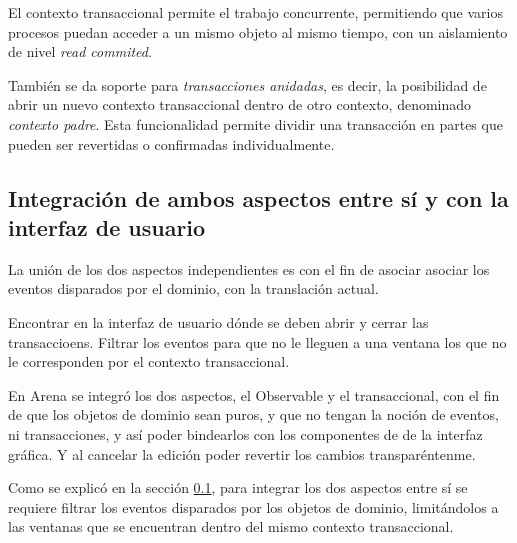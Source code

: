 		El contexto transaccional permite el trabajo concurrente, permitiendo que
		varios procesos puedan acceder a un mismo objeto al mismo
		tiempo, con un aislamiento de nivel \emph{read commited}.
		 
		También se da soporte para \emph{transacciones anidadas}, es decir, la
		posibilidad de abrir un nuevo contexto transaccional dentro de otro contexto,
		denominado \emph{contexto padre}.
		Esta funcionalidad permite dividir una transacción en partes que pueden ser
		revertidas o confirmadas individualmente.
		
	\subsection{Integración de ambos aspectos entre sí y con la interfaz de usuario}
	\label{sec:Union}
		La unión de los dos aspectos independientes es con el fin de asociar asociar los
		eventos disparados por el dominio, con la translación actual.
		 
		Encontrar en la interfaz de usuario dónde se deben abrir y cerrar las
		transaccioens.
		Filtrar los eventos para que no le lleguen a una ventana los que no le
		corresponden por el contexto transaccional.
	
		 En Arena se integró los dos aspectos, el Observable y
		el transaccional, con el fin de que los objetos de dominio sean puros, y que no tengan la noción de
		eventos, ni transacciones, y así poder bindearlos con los componentes de de la
		interfaz gráfica. Y al cancelar la edición poder revertir los cambios
		transparéntenme.
	
		Como se explicó en la sección \ref{sec:Union}, para integrar los dos aspectos
		entre sí se requiere filtrar los eventos disparados por los objetos de dominio, 
		limitándolos a las ventanas que se encuentran dentro del mismo contexto
		transaccional.